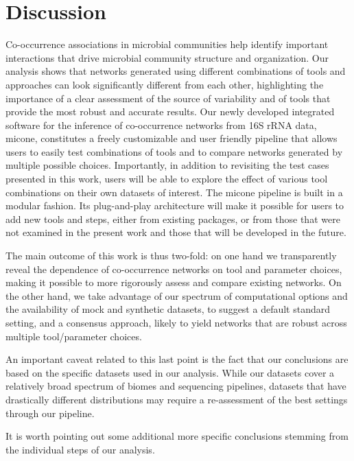 
\section*{Discussion}

Co-occurrence associations in microbial communities help identify important interactions that drive microbial community structure and organization.
Our analysis shows that networks generated using different combinations of tools and approaches can look significantly different from each other, highlighting the importance of a clear assessment of the source of variability and of tools that provide the most robust and accurate results.
Our newly developed integrated software for the inference of co-occurrence networks from 16S rRNA data, \ac{micone}, constitutes a freely customizable and user friendly pipeline that allows users to easily test combinations of tools and to compare networks generated by multiple possible choices.
Importantly, in addition to revisiting the test cases presented in this work, users will be able to explore the effect of various tool combinations on their own datasets of interest.
The \ac{micone} pipeline is built in a modular fashion. Its plug-and-play architecture will make it possible for users to add new tools and steps, either from existing packages, or from those that were not examined in the present work and those that will be developed in the future.

The main outcome of this work is thus two-fold: on one hand we transparently reveal the dependence of co-occurrence networks on tool and parameter choices, making it possible to more rigorously assess and compare existing networks. On the other hand, we take advantage of our spectrum of computational options and the availability of mock and synthetic datasets, to suggest a default standard setting, and a consensus approach, likely to yield networks that are robust across multiple tool/parameter choices.

An important caveat related to this last point is the fact that our conclusions are based on the specific datasets used in our analysis. While our datasets cover a relatively broad spectrum of biomes and sequencing pipelines, datasets that have drastically different distributions may require a re-assessment of the best settings through our pipeline.

It is worth pointing out some additional more specific conclusions stemming from the individual steps of our analysis.

